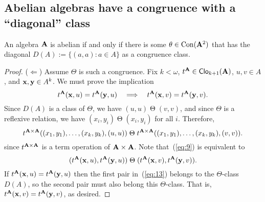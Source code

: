\subsection{Abelian algebras have a congruence with a ``diagonal'' class}
\label{sec:abel-algebr-diag}
\begin{lem}
 An algebra $\mathbf{A}$ is abelian if and only if there is some 
 $\theta \in \operatorname{Con} (\mathbf{A}^2)$ that has the diagonal $D(A):= \{(a,a): a \in A\}$ 
 as a congruence class.
\end{lem}
\begin{proof}
($\Leftarrow$) Assume $\Theta$ is such a congruence.  Fix 
  $k<\omega$,
  $t^{\mathbf{A}}\in \operatorname{\mathsf{Clo}}_{k+1}(\mathbf{A})$, 
  $u, v \in A$, and
  $\mathbf{x}, \mathbf{y} \in A^k$.
  We must prove the implication
\begin{equation*}
t^{\mathbf{A}}(\mathbf{x},u) = t^{\mathbf{A}}(\mathbf{y},u) \quad \Longrightarrow \quad 
t^{\mathbf{A}}(\mathbf{x},v) = t^{\mathbf{A}}(\mathbf{y},v).
\end{equation*}
Since $D(A)$ is a class of $\Theta$, we have 
  $(u,u) \mathrel{\Theta} (v,v)$, and since $\Theta$ is a reflexive relation, we have
  $(x_i,y_i)  \mathrel{\Theta} (x_i,y_i)$ for all $i$.  Therefore,
\begin{equation}
  \label{eq:9}  
  t^{\mathbf{A}\times \mathbf{A}}((x_1,y_1), \dots, (x_k,y_k), (u,u))
  \mathrel{\Theta}
  t^{\mathbf{A}\times \mathbf{A}}((x_1,y_1), \dots, (x_k,y_k), (v,v)).
\end{equation}
  since $t^{\mathbf{A} \times \mathbf{A}}$ is a term operation of $\mathbf{A}\times \mathbf{A}$.
  Note that~(\ref{eq:9}) is equivalent to
  \begin{equation}
    \label{eq:13}
    (t^{\mathbf{A}}(\mathbf{x}, u), t^{\mathbf{A}}(\mathbf{y},u))
    \mathrel{\Theta}
    (t^{\mathbf{A}}(\mathbf{x}, v), t^{\mathbf{A}}(\mathbf{y}, v)).
  \end{equation}
  If $t^{\mathbf{A}}(\mathbf{x}, u)= t^{\mathbf{A}}(\mathbf{y}, u)$ then 
  the first pair in~(\ref{eq:13}) belongs to the $\Theta$-class
  $D(A)$, so the second pair must also belong this $\Theta$-class.
  That is, $t^{\mathbf{A}}(\mathbf{x}, v)= t^{\mathbf{A}}(\mathbf{y}, v)$, as desired.

  \vskip2mm


\end{proof}
